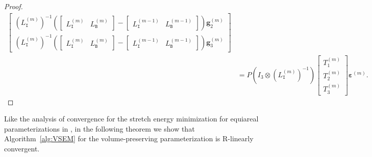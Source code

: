 \documentclass[onefignum,onetabnum]{siamonline220329}
\numberwithin{equation}{section}
\def\I{\mathtt{I}}
\def\B{\mathtt{B}}
\def\beps{{\boldsymbol{\varepsilon}}}
\begin{document}
\begin{sloppypar}
\begin{proof}
\begin{align}
\begin{bmatrix}
\left( L_{\I}^{(m)} \right)^{-1} \left( \begin{bmatrix} 
L_{\I}^{(m)} & L_{\B}^{(m)} 
\end{bmatrix} - \begin{bmatrix} 
L_{\I}^{(m-1)} & L_{\B}^{(m-1)} 
\end{bmatrix} \right) \mathbf{g}^{(m)}_2 \\
\left( L_{\I}^{(m)} \right)^{-1} \left( \begin{bmatrix} 
L_{\I}^{(m)} & L_{\B}^{(m)} 
\end{bmatrix} - \begin{bmatrix} 
L_{\I}^{(m-1)} & L_{\B}^{(m-1)} 
\end{bmatrix} \right) \mathbf{g}^{(m)}_3
\end{bmatrix} \nonumber \\
&= P \left( I_3 \otimes  ( L_{\I}^{(m)}  )^{-1} \right)
\begin{bmatrix}
T_1^{(m)} \\ T_2^{(m)} \\ T_3^{(m)}
\end{bmatrix} \beps^{(m)}. \label{eq:eps_mp1}
\end{align}
\end{proof}

Like the analysis of convergence for the stretch energy minimization for equiareal parameterizations in \cite{HuLL22}, in the following theorem we show that Algorithm~\ref{alg:VSEM} for the volume-preserving parameterization is R-linearly convergent.


\end{sloppypar}
\end{document}
